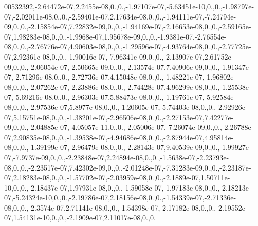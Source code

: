 \begin{DoxyCompactItemize}
00532392,-\/2.\-64472e-\/07,2.\-2455e-\/08,0.,0.,-\/1.\-97107e-\/07,-\/5.\-63451e-\/10,0.,0.,-\/1.\-98797e-\/07,-\/2.\-02011e-\/08,0.,0.,-\/2.\-59401e-\/07,2.\-17634e-\/08,0.,0.,-\/1.\-94111e-\/07,-\/7.\-24794e-\/09,0.,0.,-\/2.\-15854e-\/07,7.\-22832e-\/09,0.,0.,-\/1.\-94169e-\/07,-\/2.\-16653e-\/08,0.,0.,-\/2.\-59165e-\/07,1.\-98283e-\/08,0.,0.,-\/1.\-9968e-\/07,1.\-95678e-\/09,0.,0.,-\/1.\-9381e-\/07,-\/2.\-76554e-\/08,0.,0.,-\/2.\-76776e-\/07,4.\-90603e-\/08,0.,0.,-\/1.\-29596e-\/07,-\/4.\-93764e-\/08,0.,0.,-\/2.\-77725e-\/07,2.\-92361e-\/08,0.,0.,-\/1.\-90016e-\/07,-\/7.\-96341e-\/09,0.,0.,-\/2.\-13907e-\/07,2.\-61752e-\/09,0.,0.,-\/2.\-06054e-\/07,-\/2.\-50665e-\/09,0.,0.,-\/2.\-13574e-\/07,7.\-40906e-\/09,0.,0.,-\/1.\-91347e-\/07,-\/2.\-71296e-\/08,0.,0.,-\/2.\-72736e-\/07,4.\-15048e-\/08,0.,0.,-\/1.\-48221e-\/07,-\/1.\-96802e-\/08,0.,0.,-\/2.\-07262e-\/07,-\/2.\-23886e-\/08,0.,0.,-\/2.\-74428e-\/07,4.\-96299e-\/08,0.,0.,-\/1.\-25538e-\/07,-\/5.\-69216e-\/08,0.,0.,-\/2.\-96303e-\/07,5.\-88473e-\/08,0.,0.,-\/1.\-19761e-\/07,-\/5.\-92584e-\/08,0.,0.,-\/2.\-97536e-\/07,5.\-8977e-\/08,0.,0.,-\/1.\-20605e-\/07,-\/5.\-74403e-\/08,0.,0.,-\/2.\-92926e-\/07,5.\-15751e-\/08,0.,0.,-\/1.\-38201e-\/07,-\/2.\-96506e-\/08,0.,0.,-\/2.\-27153e-\/07,7.\-42277e-\/09,0.,0.,-\/2.\-04885e-\/07,-\/4.\-05057e-\/11,0.,0.,-\/2.\-05006e-\/07,-\/7.\-26074e-\/09,0.,0.,-\/2.\-26788e-\/07,2.\-90835e-\/08,0.,0.,-\/1.\-39538e-\/07,-\/4.\-94686e-\/08,0.,0.,-\/2.\-87944e-\/07,4.\-95814e-\/08,0.,0.,-\/1.\-39199e-\/07,-\/2.\-96479e-\/08,0.,0.,-\/2.\-28143e-\/07,9.\-40539e-\/09,0.,0.,-\/1.\-99927e-\/07,-\/7.\-9737e-\/09,0.,0.,-\/2.\-23848e-\/07,2.\-24894e-\/08,0.,0.,-\/1.\-5638e-\/07,-\/2.\-23793e-\/08,0.,0.,-\/2.\-23517e-\/07,7.\-42302e-\/09,0.,0.,-\/2.\-01248e-\/07,-\/7.\-31283e-\/09,0.,0.,-\/2.\-23187e-\/07,2.\-18283e-\/08,0.,0.,-\/1.\-57702e-\/07,-\/2.\-03959e-\/08,0.,0.,-\/2.\-1889e-\/07,1.\-50711e-\/10,0.,0.,-\/2.\-18437e-\/07,1.\-97931e-\/08,0.,0.,-\/1.\-59058e-\/07,-\/1.\-97183e-\/08,0.,0.,-\/2.\-18213e-\/07,-\/5.\-24324e-\/10,0.,0.,-\/2.\-19786e-\/07,2.\-18156e-\/08,0.,0.,-\/1.\-54339e-\/07,-\/2.\-71336e-\/08,0.,0.,-\/2.\-3574e-\/07,2.\-71141e-\/08,0.,0.,-\/1.\-54398e-\/07,-\/2.\-17182e-\/08,0.,0.,-\/2.\-19552e-\/07,1.\-54131e-\/10,0.,0.,-\/2.\-1909e-\/07,2.\-11017e-\/08,0.,0.
\end{DoxyCompactItemize}
